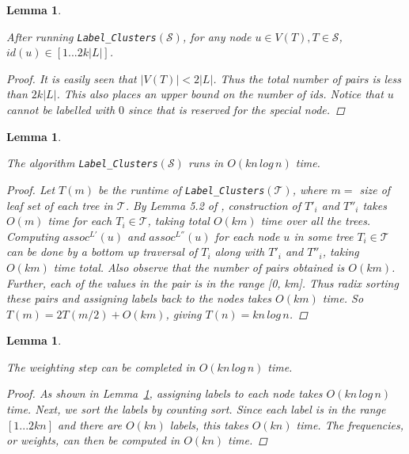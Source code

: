 \documentclass{article}
\newtheorem{labelclustersidbounds}[incompatibility]{Lemma}
\newtheorem{labelclustersruntime}[incompatibility]{Lemma}
\newtheorem{weightingruntime}[incompatibility]{Lemma}
\begin{document}
    \medskip
    \begin{labelclustersidbounds}
        \label{lem:labelclustersidbounds}

        After running \texttt{Label\_Clusters}$(\mathcal{S})$, for any node $u \in V(T), T \in \mathcal{S}$, $id(u) \in [1 ... 2k |L|]$.

        \begin{proof}
            It is easily seen that $|V(T)| < 2|L|$. Thus the total number of pairs is less than $2k|L|$. This also places an upper bound on the number of ids. Notice that $u$ cannot be labelled with $0$ since that is reserved for the special node.
        \end{proof}
    \end{labelclustersidbounds}

    \medskip
    \begin{labelclustersruntime}
        \label{lem:labelclustersruntime}

        The algorithm \texttt{Label\_Clusters}$(\mathcal{S})$ runs in $O(kn\,log\,n)$ time.

        \begin{proof}
            Let $T(m)$ be the runtime of \texttt{Label\_Clusters}$(\mathcal{T})$, where $m =$ size of leaf set of each tree in $\mathcal{T}$. By Lemma 5.2 of \cite{farach1995fast}, construction of $T'_i$ and $T''_i$ takes $O(m)$ time for each $T_i \in \mathcal{T}$, taking total $O(km)$ time over all the trees. Computing $assoc^{L'}(u)$ and $assoc^{L''}(u)$ for each node $u$ in some tree $T_i \in \mathcal{T}$ can be done by a bottom up traversal of $T_i$ along with $T'_i$ and $T''_i$, taking $O(km)$ time total. Also observe that the number of pairs obtained is $O(km)$. Further, each of the values in the pair is in the range [0, km]. Thus radix sorting these pairs and assigning labels back to the nodes takes $O(km)$ time. So $T(m) = 2T(m/2) + O(km)$, giving $T(n) = kn\,log\,n$.
        \end{proof}
    \end{labelclustersruntime}

    \medskip
    \begin{weightingruntime}
        \label{lem:weightingruntime}

        The weighting step can be completed in $O(kn\,log\,n)$ time.

        \begin{proof}
            As shown in Lemma~\ref{lem:labelclustersruntime}, assigning labels to each node takes $O(kn\,log\,n)$ time. Next, we sort the labels by counting sort. Since each label is in the range $[1 ... 2kn]$ and there are $O(kn)$ labels, this takes $O(kn)$ time. The frequencies, or weights, can then be computed in $O(kn)$ time.
        \end{proof}
    \end{weightingruntime}
\end{document}
